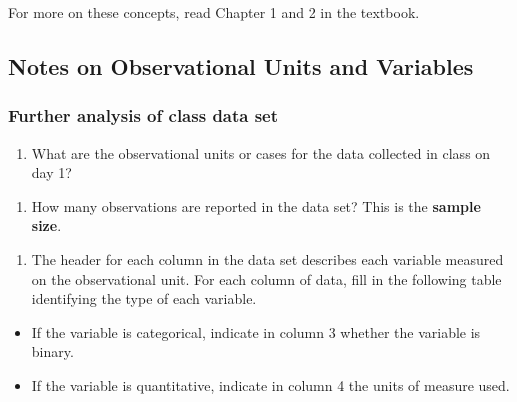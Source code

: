 \documentclass[
]{report}
\providecommand{\tightlist}{%
  \setlength{\itemsep}{0pt}\setlength{\parskip}{0pt}}
\begin{document}
For more on these concepts, read Chapter 1 and 2 in the textbook.

\subsection*{Notes on Observational Units and Variables}\label{notes-on-observational-units-and-variables}

\vspace{4in}

\subsubsection*{Further analysis of class data set}\label{further-analysis-of-class-data-set}

\begin{enumerate}
\def\labelenumi{\arabic{enumi}.}
\tightlist
\item
  What are the observational units or cases for the data collected in class on day 1?
\end{enumerate}

\vspace{0.3in}

\begin{enumerate}
\def\labelenumi{\arabic{enumi}.}
\setcounter{enumi}{1}
\tightlist
\item
  How many observations are reported in the data set? This is the \textbf{sample size}.
\end{enumerate}

\vspace{0.3in}

\begin{enumerate}
\def\labelenumi{\arabic{enumi}.}
\setcounter{enumi}{2}
\tightlist
\item
  The header for each column in the data set describes each variable measured on the observational unit. For each column of data, fill in the following table identifying the type of each variable.
\end{enumerate}

\begin{itemize}
\item
  If the variable is categorical, indicate in column 3 whether the variable is binary.
\item
  If the variable is quantitative, indicate in column 4 the units of measure used.
\end{itemize}
\end{document}

